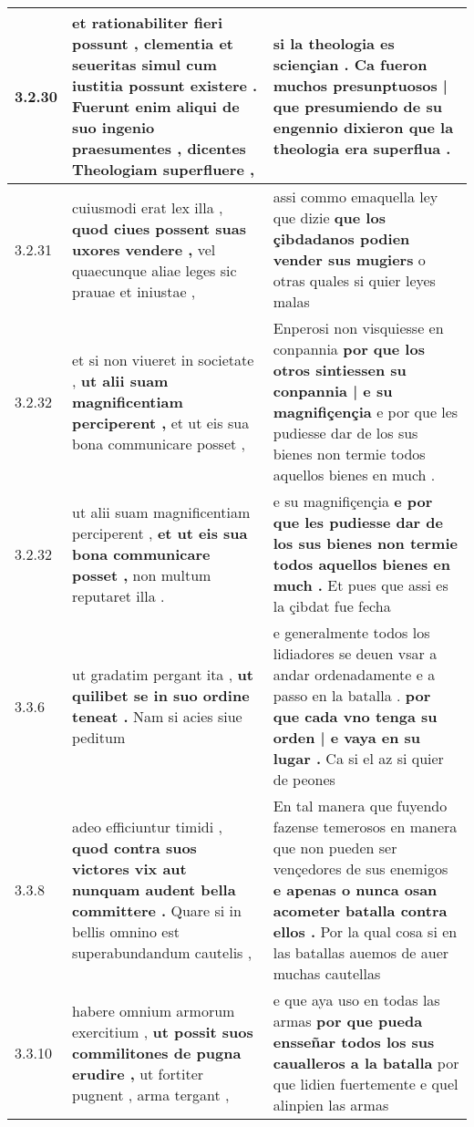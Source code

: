 \begin{tabular}{|p{1cm}|p{6.5cm}|p{6.5cm}|}
3.2.30 & et rationabiliter fieri possunt , clementia et seueritas simul cum iustitia possunt existere . \textbf{ Fuerunt enim aliqui de suo ingenio praesumentes , } dicentes Theologiam superfluere , & si la theologia es sciençian . \textbf{ Ca fueron muchos presunptuosos | que presumiendo de su engennio dixieron } que la theologia era superflua . \\\hline
3.2.31 & cuiusmodi erat lex illa , \textbf{ quod ciues possent suas uxores vendere , } vel quaecunque aliae leges sic prauae et iniustae , & assi commo emaquella ley que dizie \textbf{ que los çibdadanos podien vender sus mugiers } o otras quales si quier leyes malas \\\hline
3.2.32 & et si non viueret in societate , \textbf{ ut alii suam magnificentiam perciperent , } et ut eis sua bona communicare posset , & Enperosi non visquiesse en conpannia \textbf{ por que los otros sintiessen su conpannia | e su magnifiçençia } e por que les pudiesse dar de los sus bienes non termie todos aquellos bienes en much . \\\hline
3.2.32 & ut alii suam magnificentiam perciperent , \textbf{ et ut eis sua bona communicare posset , } non multum reputaret illa . & e su magnifiçençia \textbf{ e por que les pudiesse dar de los sus bienes non termie todos aquellos bienes en much . } Et pues que assi es la çibdat fue fecha \\\hline
3.3.6 & ut gradatim pergant ita , \textbf{ ut quilibet se in suo ordine teneat . } Nam si acies siue peditum & e generalmente todos los lidiadores se deuen vsar a andar ordenadamente e a passo en la batalla . \textbf{ por que cada vno tenga su orden | e vaya en su lugar . } Ca si el az si quier de peones \\\hline
3.3.8 & adeo efficiuntur timidi , \textbf{ quod contra suos victores vix aut nunquam audent bella committere . } Quare si in bellis omnino est superabundandum cautelis , & En tal manera que fuyendo fazense temerosos en manera que non pueden ser vençedores de sus enemigos \textbf{ e apenas o nunca osan acometer batalla contra ellos . } Por la qual cosa si en las batallas auemos de auer muchas cautellas \\\hline
3.3.10 & habere omnium armorum exercitium , \textbf{ ut possit suos commilitones de pugna erudire , } ut fortiter pugnent , arma tergant , & e que aya uso en todas las armas \textbf{ por que pueda ensseñar todos los sus caualleros a la batalla } por que lidien fuertemente e quel alinpien las armas \\\hline

\end{tabular}
